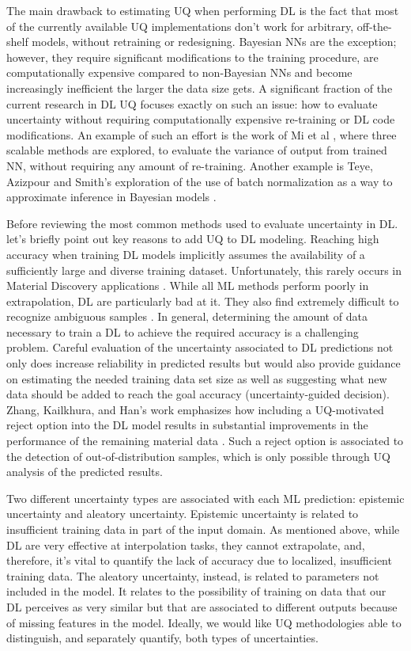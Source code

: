 \documentclass[pdflatex,sn-mathphys]{sn-jnl}%
\theoremstyle{thmstyleone}%
\theoremstyle{thmstyletwo}%
\theoremstyle{thmstylethree}%
\begin{document}
The main drawback to estimating UQ when performing DL is the fact that most of the currently available UQ implementations don’t work for arbitrary, off-the-shelf models, without retraining or redesigning. Bayesian NNs are the exception; however, they require significant modifications to the training procedure, are computationally expensive compared to non-Bayesian NNs and become increasingly inefficient the larger the data size gets. A significant fraction of the current research in DL UQ focuses exactly on such an issue: how to evaluate uncertainty without requiring computationally expensive re-training or DL code modifications. An example of such an effort is the work of Mi et al \cite{mi1910training}, where three scalable methods are explored, to evaluate the variance of output from trained NN, without requiring any amount of re-training. Another example is Teye, Azizpour and Smith’s exploration of the use of batch normalization as a way to approximate inference in Bayesian models \cite{teye2018bayesian}.  

Before reviewing the most common methods used to evaluate uncertainty in DL. let’s briefly point out key reasons to add UQ to DL modeling. Reaching high accuracy when training DL models implicitly assumes the availability of a sufficiently large and diverse training dataset. Unfortunately, this rarely occurs in Material Discovery applications \cite{zhang2021leveraging}. While all ML methods perform poorly in extrapolation, DL are particularly bad at it. They also find extremely difficult to recognize ambiguous samples \cite{zhang2020mix}. In general, determining the amount of data necessary to train a DL to achieve the required accuracy is a challenging problem. Careful evaluation of the uncertainty associated to DL predictions not only does increase reliability in predicted results but would also provide guidance on estimating the needed training data set size as well as suggesting what new data should be added to reach the goal accuracy (uncertainty-guided decision). Zhang, Kailkhura, and Han’s work emphasizes how including a UQ-motivated reject option into the DL model results in substantial improvements in the performance of the remaining material data \cite{zhang2021leveraging}. Such a reject option is associated to the detection of out-of-distribution samples, which is only possible through UQ analysis of the predicted results.

Two different uncertainty types are associated with each ML prediction: epistemic uncertainty and aleatory uncertainty. Epistemic uncertainty is related to insufficient training data in part of the input domain. As mentioned above, while DL are very effective at interpolation tasks, they cannot extrapolate, and, therefore, it’s vital to quantify the lack of accuracy due to localized, insufficient training data. The aleatory uncertainty, instead, is related to parameters not included in the model. It relates to the possibility of training on data that our DL perceives as very similar but that are associated to different outputs because of missing features in the model. Ideally, we would like UQ methodologies able to distinguish, and separately quantify, both types of uncertainties.
\end{document}
